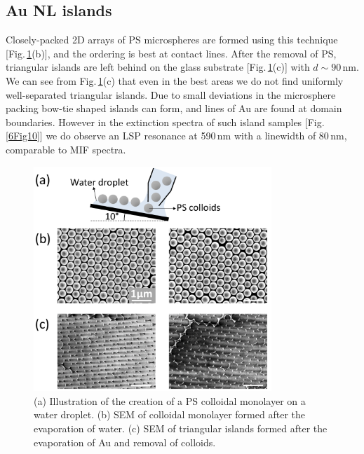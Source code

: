 \subsection{Au NL islands}
Closely-packed 2D arrays of PS microspheres are formed using this technique [Fig.\,\ref{6Fig9}(b)], and the ordering is best at contact lines. After the removal of PS, triangular islands are left behind on the glass substrate [Fig.\,\ref{6Fig9}(c)] with $d\sim90$\,nm. We can see from Fig.\,\ref{6Fig9}(c) that even in the best areas we do not find uniformly well-separated triangular islands. Due to small deviations in the microsphere packing bow-tie shaped islands can form, and lines of Au are found at domain boundaries. However in the extinction spectra of such island samples [Fig.\,\ref{6Fig10}] we do observe an LSP resonance at 590\,nm with a linewidth of 80\,nm, comparable to MIF spectra.
\begin{figure}[h!] 
\centering    
\includegraphics[width=0.8\textwidth]{Fig9}
\caption{(a) Illustration of the creation of a PS colloidal monolayer on a water droplet. (b) SEM of colloidal monolayer formed after the evaporation of water. (c) SEM of triangular islands formed after the evaporation of Au and removal of colloids.}
\label{6Fig9}
\end{figure}

